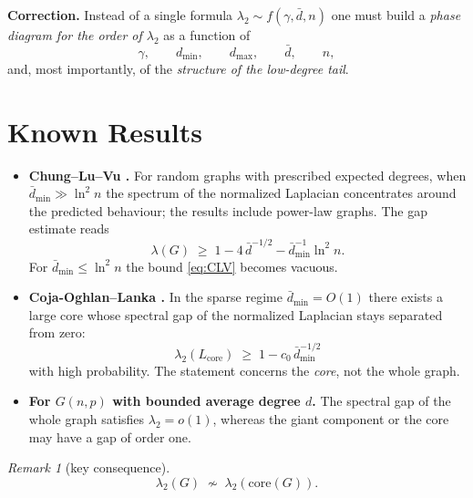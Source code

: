 \documentclass[11pt,a4paper]{article}
\theoremstyle{plain}
\theoremstyle{definition}
\theoremstyle{remark}
\newtheorem{remark}[theorem]{Remark}
\newcommand{\core}{\mathrm{core}}
\newcommand{\dmin}{d_{\min}}
\newcommand{\dmax}{d_{\max}}
\newcommand{\dbar}{\bar d}
\newcommand{\lamtwo}{\lambda_2}
\begin{document}
\textbf{Correction.} Instead of a single formula
$\lamtwo\sim f(\gamma,\dbar,n)$ one must build a \emph{phase diagram for the
order of $\lamtwo$} as a function of
\begin{equation}
\gamma,\qquad \dmin,\qquad \dmax,\qquad \dbar,\qquad n,
\end{equation}
and, most importantly, of the \emph{structure of the low-degree tail}.

\section{Known Results}
\label{sec:known}

\begin{itemize}[leftmargin=*]
\item \textbf{Chung--Lu--Vu \cite{ChungLuVu2003}.} For random graphs with
prescribed expected degrees, when $\dbar_{\min}\gg\ln^2 n$ the spectrum of the
normalized Laplacian concentrates around the predicted behaviour; the results
include power-law graphs. The gap estimate reads
\begin{equation}
\lambda(G)\;\ge\;1-4\,\dbar^{-1/2}-\dbar_{\min}^{-1}\ln^2 n .
\label{eq:CLV}
\end{equation}
For $\dbar_{\min}\le\ln^2 n$ the bound \eqref{eq:CLV} becomes vacuous.

\item \textbf{Coja-Oghlan--Lanka \cite{CojaLanka2009}.} In the sparse regime
$\dbar_{\min}=O(1)$ there exists a large core whose spectral gap of the
normalized Laplacian stays separated from zero:
\begin{equation}
\lamtwo(L_{\core})\;\ge\;1-c_0\,\dbar_{\min}^{-1/2}
\label{eq:COL}
\end{equation}
with high probability. The statement concerns the \emph{core}, not the whole
graph.

\item \textbf{For $G(n,p)$ with bounded average degree $d$.} The spectral gap
of the whole graph satisfies $\lamtwo=o(1)$, whereas the giant component or the
core may have a gap of order one.
\end{itemize}

\begin{remark}[key consequence]
\begin{equation}
\boxed{\;\lamtwo(G)\;\not\sim\;\lamtwo(\core(G)).\;}
\end{equation}
\end{remark}
\end{document}
